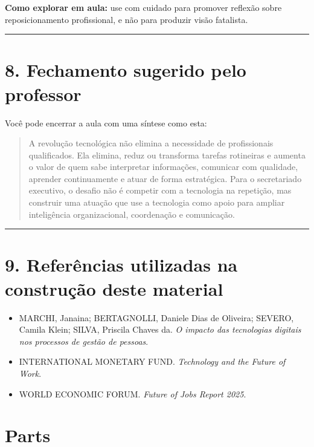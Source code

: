 \documentclass[
]{book}
\providecommand{\tightlist}{%
  \setlength{\itemsep}{0pt}\setlength{\parskip}{0pt}}
\theoremstyle{definition}
\theoremstyle{definition}
\theoremstyle{definition}
\theoremstyle{definition}
\theoremstyle{remark}
\begin{document}
\textbf{Como explorar em aula:} use com cuidado para promover reflexão sobre reposicionamento profissional, e não para produzir visão fatalista.

\begin{center}\rule{0.5\linewidth}{0.5pt}\end{center}

\chapter{8. Fechamento sugerido pelo professor}\label{fechamento-sugerido-pelo-professor}

Você pode encerrar a aula com uma síntese como esta:

\begin{quote}
A revolução tecnológica não elimina a necessidade de profissionais qualificados. Ela elimina, reduz ou transforma tarefas rotineiras e aumenta o valor de quem sabe interpretar informações, comunicar com qualidade, aprender continuamente e atuar de forma estratégica. Para o secretariado executivo, o desafio não é competir com a tecnologia na repetição, mas construir uma atuação que use a tecnologia como apoio para ampliar inteligência organizacional, coordenação e comunicação.
\end{quote}

\begin{center}\rule{0.5\linewidth}{0.5pt}\end{center}

\chapter{9. Referências utilizadas na construção deste material}\label{referuxeancias-utilizadas-na-construuxe7uxe3o-deste-material}

\begin{itemize}
\tightlist
\item
  MARCHI, Janaina; BERTAGNOLLI, Daniele Dias de Oliveira; SEVERO, Camila Klein; SILVA, Priscila Chaves da. \emph{O impacto das tecnologias digitais nos processos de gestão de pessoas}.
\item
  INTERNATIONAL MONETARY FUND. \emph{Technology and the Future of Work}.
\item
  WORLD ECONOMIC FORUM. \emph{Future of Jobs Report 2025}.
\end{itemize}

\chapter{Parts}\label{parts}
\end{document}
